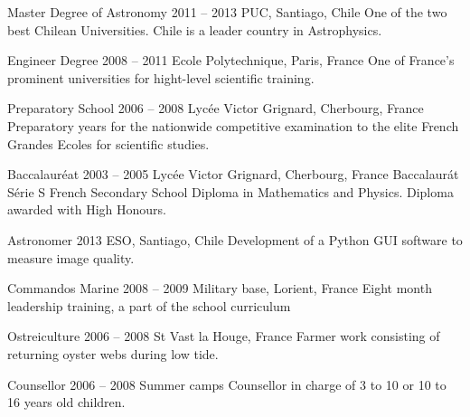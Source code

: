 



\begin{coordinatelist}
\end{coordinatelist}




\begin{yearlist}
\item[Master Degree of Astronomy]{2011 -- 2013}
	{PUC, Santiago, Chile}
    {One of the two best Chilean Universities. 
    Chile is a leader country in Astrophysics.}

\item[Engineer Degree]{2008 -- 2011}
	{Ecole Polytechnique, Paris, France}
    {One of France's prominent universities for hight-­level scientific training.}


\item[Preparatory School]{2006 -- 2008}
	{Lyc\'ee Victor Grignard, Cherbourg, France}
	{Preparatory years for the nationwide competitive examination to the elite French Grandes Ecoles for scientific studies.  }


\item[Baccalaur\'eat]{2003 -- 2005}
	{Lyc\'ee Victor Grignard, Cherbourg, France}
	{Baccalaur\'at S\'erie S French Secondary School Diploma in Mathematics and Physics. 
    Diploma awarded with High Honours.}

\end{yearlist}


\begin{joblist}

\item[Astronomer]{2013}
	{ESO, Santiago, Chile}
	{Development of a Python GUI software to measure image quality.}


\item[Commandos Marine]{2008 -- 2009}
	{Military base, Lorient, France}
	{Eight ­month leadership training, a part of the school curriculum}

\item[Ostreiculture]{2006 -- 2008}
	{St Vast la Houge, France}
	{Farmer work consisting of returning oyster webs during low tide.}


\item[Counsellor]{2006 -- 2008}
	{Summer camps}
	{Counsellor in charge of 3 to 10 or 10 to 16 years old children.}
\end{joblist}


